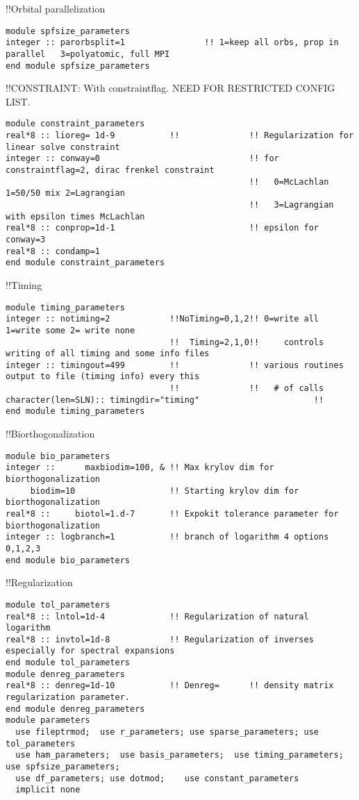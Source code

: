 !!{\large \quad Orbital parallelization}
\begin{verbatim}
module spfsize_parameters
integer :: parorbsplit=1                !! 1=keep all orbs, prop in parallel   3=polyatomic, full MPI
end module spfsize_parameters
\end{verbatim}
!!{\large \quad CONSTRAINT: With constraintflag. NEED FOR RESTRICTED CONFIG LIST.}
\begin{verbatim}
module constraint_parameters
real*8 :: lioreg= 1d-9           !!              !! Regularization for linear solve constraint
integer :: conway=0                              !! for constraintflag=2, dirac frenkel constraint
                                                 !!   0=McLachlan 1=50/50 mix 2=Lagrangian
                                                 !!   3=Lagrangian with epsilon times McLachlan
real*8 :: conprop=1d-1                           !! epsilon for conway=3
real*8 :: condamp=1
end module constraint_parameters
\end{verbatim}
!!{\large \quad Timing}
\begin{verbatim}
module timing_parameters
integer :: notiming=2            !!NoTiming=0,1,2!! 0=write all 1=write some 2= write none
                                 !!  Timing=2,1,0!!     controls writing of all timing and some info files
integer :: timingout=499         !!              !! various routines output to file (timing info) every this 
                                 !!              !!   # of calls
character(len=SLN):: timingdir="timing"                       !!
end module timing_parameters
\end{verbatim}
!!{\large \quad Biorthogonalization }
\begin{verbatim}
module bio_parameters
integer ::      maxbiodim=100, & !! Max krylov dim for biorthogonalization
     biodim=10                   !! Starting krylov dim for biorthogonalization
real*8 ::     biotol=1.d-7       !! Expokit tolerance parameter for biorthogonalization
integer :: logbranch=1           !! branch of logarithm 4 options 0,1,2,3
end module bio_parameters
\end{verbatim}
!!{\large \quad Regularization}
\begin{verbatim}
module tol_parameters
real*8 :: lntol=1d-4             !! Regularization of natural logarithm
real*8 :: invtol=1d-8            !! Regularization of inverses especially for spectral expansions
end module tol_parameters
module denreg_parameters
real*8 :: denreg=1d-10           !! Denreg=      !! density matrix regularization parameter.
end module denreg_parameters
module parameters
  use fileptrmod;  use r_parameters; use sparse_parameters; use tol_parameters
  use ham_parameters;  use basis_parameters;  use timing_parameters; use spfsize_parameters;
  use df_parameters; use dotmod;    use constant_parameters
  implicit none
\end{verbatim}
